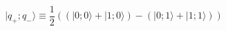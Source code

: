 \begin{equation}
\label{2pm}
|q_+;q_- \rangle \equiv \frac{1}{2}\left(  
(|0;0 \rangle+|1;0 \rangle)-(|0;1 \rangle+|1;1 \rangle)\right)
\end{equation}

